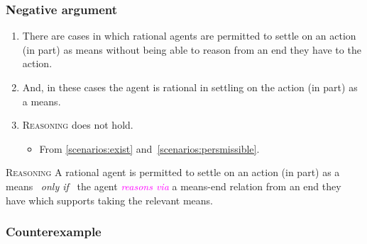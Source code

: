\documentclass[noamssymb,
graphics,
]{beamer} %
\newcommand{\schemaName}[1]{\textsc{#1}}
\newcommand{\hozlinedash}[0]{
  \noindent\hdashrule[0.5ex][c]{\textwidth}{.1pt}{2.5pt}
}
\begin{document}
\begin{frame}
  \frametitle{Negative argument}

  {%
  \begin{enumerate}
  \item\label{scenarios:exist} There are cases in which rational agents are permitted to settle on an action (in part) as means without being able to reason from an end they have to the action.
  \item\label{scenarios:persmissible} And, in these cases the agent is rational in settling on the action (in part) as a means.
  \item \schemaName{Reasoning} does not hold.
    \begin{itemize}
    \item From \ref{scenarios:exist} and~\ref{scenarios:persmissible}.
    \end{itemize}
  \end{enumerate}
  }

  \hozlinedash
  {
    \begin{block}{\schemaName{Reasoning}}
      A rational agent is permitted to settle on an action (in part) as a means
      \newline
      \mbox{ }\hfill\emph{only if}\hfill\mbox{ }
      \newline
      the agent \textcolor{fuchsia}{\emph{reasons via}} a means-end relation from an end they have which supports taking the relevant means.
    \end{block}
  }
\end{frame}

\subsubsection{Counterexample}
\label{sec:counterexample}
\end{document}
